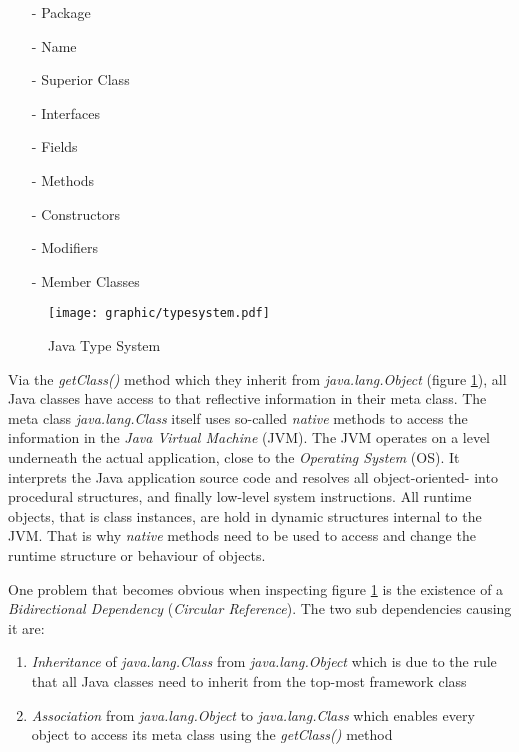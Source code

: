 \begin{itemize}
    \item[-] Package
    \item[-] Name
    \item[-] Superior Class
    \item[-] Interfaces
    \item[-] Fields
    \item[-] Methods
    \item[-] Constructors
    \item[-] Modifiers
    \item[-] Member Classes
\end{itemize}

\begin{figure}[ht]
    \begin{center}
        \texttt{[image: graphic/typesystem.pdf]}
        \caption{Java Type System}
        \label{typesystem_figure}
    \end{center}
\end{figure}

Via the \emph{getClass()} method which they inherit from \emph{java.lang.Object}
(figure \ref{typesystem_figure}), all Java classes have access to that reflective
information in their meta class. The meta class \emph{java.lang.Class} itself
uses so-called \emph{native} methods to access the information in the
\emph{Java Virtual Machine} (JVM). The JVM operates on a level underneath the
actual application, close to the \emph{Operating System} (OS). It interprets
the Java application source code and resolves all object-oriented- into
procedural structures, and finally low-level system instructions. All runtime
objects, that is class instances, are hold in dynamic structures internal to
the JVM. That is why \emph{native} methods need to be used to access and change
the runtime structure or behaviour of objects.

One problem that becomes obvious when inspecting figure \ref{typesystem_figure}
is the existence of a \emph{Bidirectional Dependency} (\emph{Circular Reference}).
The two sub dependencies causing it are:

\begin{enumerate}
    \item \emph{Inheritance} of \emph{java.lang.Class} from \emph{java.lang.Object}
        which is due to the rule that all Java classes need to inherit from the
        top-most framework class
    \item \emph{Association} from \emph{java.lang.Object} to \emph{java.lang.Class}
        which enables every object to access its meta class using the
        \emph{getClass()} method
\end{enumerate}

